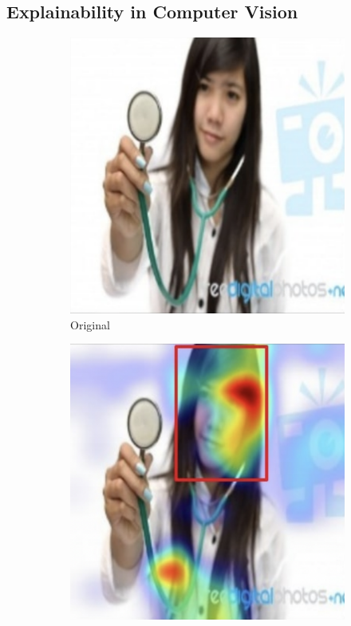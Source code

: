 \subsection{Explainability in Computer Vision}

\begin{figure}
\centering
 \begin{subfigure}{0.3\columnwidth}
    \includegraphics[width=0.95\columnwidth, height=0.95\columnwidth]{img/2-related-work/bias-computer-vision-doctor.png}
    \caption{Original}
    \label{fig:biased-model-cam-image}
  \end{subfigure}
  \begin{subfigure}{0.3\columnwidth}
    \includegraphics[width=0.95\columnwidth, height=0.95\columnwidth]{img/2-related-work/bias-computer-vision-doctor-nurse.png}

\end{subfigure}
\end{figure}
